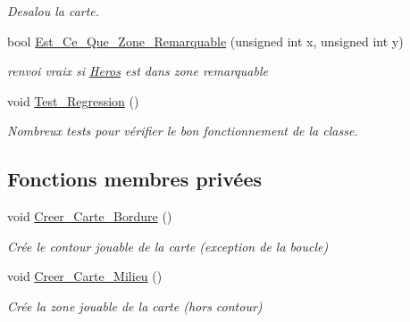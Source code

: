 \begin{DoxyCompactItemize}
\begin{DoxyCompactList}\small\item\em Desalou la carte. \end{DoxyCompactList}\item 
\hypertarget{classCarte_ac46d39ddb17179add9f1f88823ba6755}{bool \hyperlink{classCarte_ac46d39ddb17179add9f1f88823ba6755}{Est\+\_\+\+Ce\+\_\+\+Que\+\_\+\+Zone\+\_\+\+Remarquable} (unsigned int x, unsigned int y)}\label{classCarte_ac46d39ddb17179add9f1f88823ba6755}

\begin{DoxyCompactList}\small\item\em renvoi vraix si \hyperlink{classHeros}{Heros} est dans zone remarquable \end{DoxyCompactList}\item 
\hypertarget{classCarte_a3d10ce082cb5476c7c94917a71db6d12}{void \hyperlink{classCarte_a3d10ce082cb5476c7c94917a71db6d12}{Test\+\_\+\+Regression} ()}\label{classCarte_a3d10ce082cb5476c7c94917a71db6d12}

\begin{DoxyCompactList}\small\item\em Nombreux tests pour vérifier le bon fonctionnement de la classe. \end{DoxyCompactList}\end{DoxyCompactItemize}
\subsection*{Fonctions membres privées}
\begin{DoxyCompactItemize}
\item 
\hypertarget{classCarte_afc02711230cc93dae7585da8c1366506}{void \hyperlink{classCarte_afc02711230cc93dae7585da8c1366506}{Creer\+\_\+\+Carte\+\_\+\+Bordure} ()}\label{classCarte_afc02711230cc93dae7585da8c1366506}

\begin{DoxyCompactList}\small\item\em Crée le contour jouable de la carte (exception de la boucle) \end{DoxyCompactList}\item 
\hypertarget{classCarte_a73f6f5b9425239ec0f99425b2e63c63a}{void \hyperlink{classCarte_a73f6f5b9425239ec0f99425b2e63c63a}{Creer\+\_\+\+Carte\+\_\+\+Milieu} ()}\label{classCarte_a73f6f5b9425239ec0f99425b2e63c63a}

\begin{DoxyCompactList}\small\item\em Crée la zone jouable de la carte (hors contour) \end{DoxyCompactList}\end{DoxyCompactItemize}
